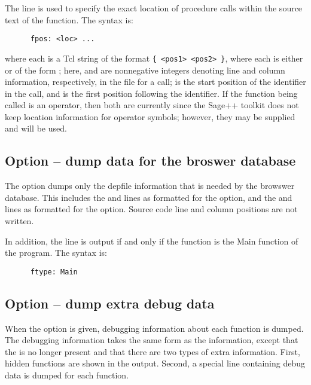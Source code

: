 The  line is used to specify the exact location of procedure calls
within the source text of the function. The syntax is:
\begin{verbatim}
      fpos: <loc> ...
\end{verbatim}
\noindent
where each  is a Tcl string of the format \verb+{ <pos1> <pos2> }+,
where each  is either \code{-} or of the form ;
here,  and  are nonnegative integers denoting line
and column information, respectively, in the file for a call;  
is the start position of the identifier in the call, and  is the
first position following the identifier. If the function being called is
an operator, then both  are currently \code{-} since the Sage++
toolkit does not keep location information for operator symbols; however,
they may be supplied and will be used.

\subsection{Option  -- dump data for the broswer database}

The  option dumps only the depfile information that is needed
by the browswer database.  This includes the  and
 lines as formatted for the  option, and the
 and  lines as formatted for the 
option.  Source code line and column positions are not written.

In addition, the  line is output if and only if the function
is the Main function of the program. The syntax is:
\begin{verbatim}
      ftype: Main
\end{verbatim}
\noindent


\subsection{Option  -- dump extra debug data}

When the  option is given, debugging information about
each function is dumped. The debugging information takes the same form
as the  information, except that the  is no
longer present and that there are two types of extra information. First,
hidden functions are shown in the output. Second, a special line
 containing debug data is dumped for each function.

